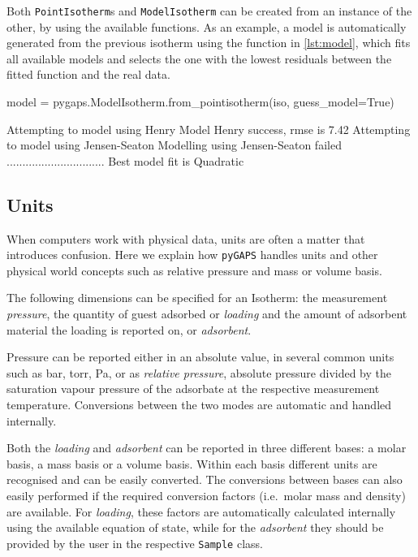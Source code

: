 Both \texttt{PointIsotherm}s and \texttt{ModelIsotherm} can
be created from an instance of the other, by using the 
available functions. As an example, a model is automatically
generated from the previous isotherm using the function in
\autoref{lst:model}, which fits all available models and selects
the one with the lowest residuals between the fitted function
and the real data.

\begin{python}[caption={Guessing the best model},label={lst:model}]
model = pygaps.ModelIsotherm.from_pointisotherm(iso, guess_model=True)
\end{python}
\begin{pythonout}
Attempting to model using Henry
Model Henry success, rmse is 7.42
Attempting to model using Jensen-Seaton
Modelling using Jensen-Seaton failed
...............................
Best model fit is Quadratic
\end{pythonout}

\subsection{Units}

When computers work with physical data, units are often a matter 
that introduces confusion. Here we explain how \texttt{pyGAPS} 
handles units and other physical world concepts such as relative
pressure and mass or volume basis.

The following dimensions can be specified for an Isotherm: 
the measurement \textit{pressure}, the quantity of guest adsorbed
or \textit{loading} and the amount of adsorbent material
the loading is reported on, or \textit{adsorbent}.

Pressure can be reported either in an absolute value, in several 
common units such as \si{\bar}, torr, \si{\pascal}, or as 
\textit{relative pressure}, absolute pressure divided by the 
saturation vapour pressure of the adsorbate at the respective
measurement temperature. Conversions between the two modes are 
automatic and handled internally.

Both the \textit{loading} and \textit{adsorbent} can be reported
in three different bases: a molar basis, a mass basis or a volume
basis. Within each basis different units are recognised and can be
easily converted. The conversions between bases can also
easily performed if the required conversion factors (i.e.\ molar 
mass and density) are available. For \textit{loading}, these 
factors are automatically calculated internally using the 
available equation of state, while for the \textit{adsorbent} 
they should be provided by the user in the respective \texttt{Sample}
 class.

